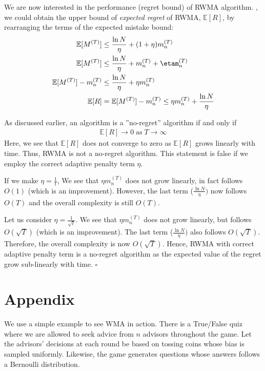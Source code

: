 \documentclass[11pt]{article}
\newcommand*{\QED}{\hfill\ensuremath{\square}}
\begin{document}
We are now interested in the performance (regret bound) of RWMA algorithm.
, we could obtain the upper bound of \textit{expected regret} of RWMA, $\mathbb{E}[R]$, by rearranging the terms of the expected mistake bound:
\begin{align}
    \mathbb{E}[M^{(T)}]&\leq \frac{\ln N}{\eta} +  (1+\eta)m_n^{(T)} \\
    \mathbb{E}[M^{(T)}]&\leq \frac{\ln N}{\eta} +  m_n^{(T)}+\etam_n^{(T)} \\
    \mathbb{E}[M^{(T)}] - m_n^{(T)}&\leq \frac{\ln N}{\eta} +\eta m_n^{(T)} \\
    \mathbb{E}[R] &= \mathbb{E}[M^{(T)}] - m_n^{(T)} \leq \eta m_n^{(T)} + \frac{\ln N}{\eta} \label{eq:rwma_final}
\end{align}

As discussed earlier, an algorithm is a ”no-regret” algorithm if and only if 
\begin{align}
    \mathbb{E}[R] \rightarrow 0 \;
    \text{as} \; T \rightarrow \infty
\end{align}
Here, we see that $\mathbb{E}[R]
$ does not converge to zero as $\mathbb{E}[R]$ grows linearly with time. Thus, RWMA is not a no-regret algorithm. This statement is false if we employ the correct adaptive penalty term $\eta$.

If we make $\eta = \frac{1}{t}$, We see that $\eta m_n^{(T)}$ does not grow linearly, in fact follows $O(1)$ (which is an improvement). However, the last term ($ \frac{\ln N}{\eta})$ now follows $O(T)$ and the overall complexity is still $O(T)$.

Let us consider $\eta = \frac{1}{\sqrt{t}}$. We see that $\eta m_n^{(T)}$ does not grow linearly, but follows $O(\sqrt{T})$ (which is an improvement). The last term ($ \frac{\ln N}{\eta})$ also follows $O(\sqrt{T})$. Therefore, the overall complexity is now $O(\sqrt{T})$. Hence, RWMA with correct adaptive penalty term is a no-regret algorithm as the expected value of the regret grow sub-linearly with time. \QED

\section{Appendix}

We use a simple example to see WMA in action. There is a True/False quiz where we are allowed to seek advice from $n$ advisors throughout the game. Let the advisors' decisions at each round be based on tossing coins whose bias is sampled uniformly. Likewise, the game generates questions whose answers follows a Bernoulli distribution. 
\end{document}
